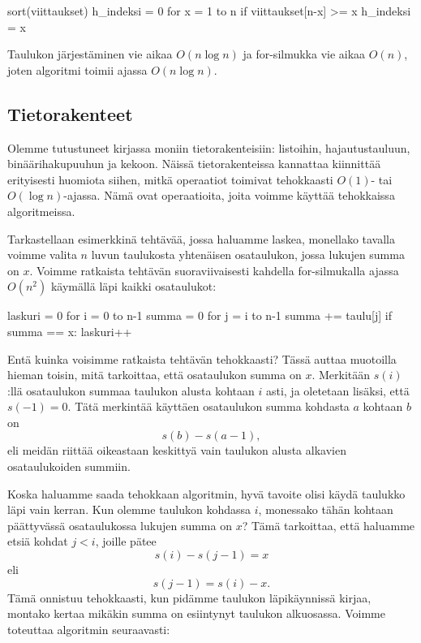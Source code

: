 \begin{code}
sort(viittaukset)
h_indeksi = 0
for x = 1 to n
    if viittaukset[n-x] >= x
        h_indeksi = x
\end{code}

Taulukon järjestäminen vie aikaa $O(n \log n)$ ja for-silmukka vie aikaa $O(n)$,
joten algoritmi toimii ajassa $O(n \log n)$.

\subsection{Tietorakenteet}

Olemme tutustuneet kirjassa moniin tietorakenteisiin:
listoihin, hajautustauluun, binäärihakupuuhun ja kekoon.
Näissä tietorakenteissa kannattaa kiinnittää erityisesti huomiota siihen,
mitkä operaatiot toimivat tehokkaasti $O(1)$- tai $O(\log n)$-ajassa.
Nämä ovat operaatioita, joita voimme käyttää tehokkaissa algoritmeissa.

Tarkastellaan esimerkkinä tehtävää, jossa haluamme laskea,
monellako tavalla voimme valita $n$ luvun taulukosta yhtenäisen osataulukon,
jossa lukujen summa on $x$.
Voimme ratkaista tehtävän suoraviivaisesti kahdella for-silmukalla
ajassa $O(n^2)$ käymällä läpi kaikki osataulukot:

\begin{code}
laskuri = 0
for i = 0 to n-1
    summa = 0
    for j = i to n-1
        summa += taulu[j]
        if summa == x:
            laskuri++
\end{code}

Entä kuinka voisimme ratkaista tehtävän tehokkaasti?
Tässä auttaa muotoilla hieman toisin, mitä tarkoittaa,
että osataulukon summa on $x$.
Merkitään $s(i)$:llä osataulukon summaa taulukon alusta
kohtaan $i$ asti, ja oletetaan lisäksi, että $s(-1)=0$.
Tätä merkintää käyttäen osataulukon summa
kohdasta $a$ kohtaan $b$ on
\[s(b)-s(a-1),\]
eli meidän riittää oikeastaan keskittyä vain taulukon alusta
alkavien osataulukoiden summiin.

Koska haluamme saada tehokkaan algoritmin,
hyvä tavoite olisi käydä taulukko läpi vain kerran.
Kun olemme taulukon kohdassa $i$,
monessako tähän kohtaan päättyvässä osataulukossa
lukujen summa on $x$?
Tämä tarkoittaa, että haluamme etsiä kohdat $j<i$,
joille pätee
\[s(i)-s(j-1)=x\]
eli
\[s(j-1)=s(i)-x.\]
Tämä onnistuu tehokkaasti, kun pidämme taulukon läpikäynnissä
kirjaa, montako kertaa mikäkin summa on esiintynyt taulukon alkuosassa.
Voimme toteuttaa algoritmin seuraavasti:

